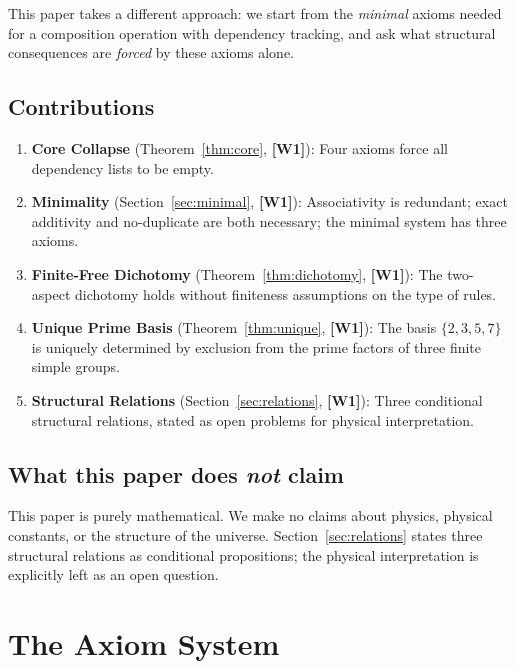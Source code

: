 ﻿\documentclass[11pt]{article}
\newcommand{\wone}[1]{\textcolor{wcolor}{\textbf{[#1]}}}
\begin{document}
This paper takes a different approach: we start from the
\emph{minimal} axioms needed for a composition operation
with dependency tracking, and ask what structural
consequences are \emph{forced} by these axioms alone.

\subsection{Contributions}
\begin{enumerate}
\item \textbf{Core Collapse} (Theorem~\ref{thm:core}, \wone{W1}):
  Four axioms force all dependency lists to be empty.
\item \textbf{Minimality} (Section~\ref{sec:minimal}, \wone{W1}):
  Associativity is redundant; exact additivity and
  no-duplicate are both necessary; the minimal system has
  three axioms.
\item \textbf{Finite-Free Dichotomy} (Theorem~\ref{thm:dichotomy}, \wone{W1}):
  The two-aspect dichotomy holds without finiteness
  assumptions on the type of rules.
\item \textbf{Unique Prime Basis} (Theorem~\ref{thm:unique}, \wone{W1}):
  The basis $\{2,3,5,7\}$ is uniquely determined by
  exclusion from the prime factors of three finite simple
  groups.
\item \textbf{Structural Relations} (Section~\ref{sec:relations}, \wone{W1}):
  Three conditional structural relations, stated as
  open problems for physical interpretation.
\end{enumerate}

\subsection{What this paper does \emph{not} claim}
This paper is purely mathematical. We make no claims about
physics, physical constants, or the structure of the
universe. Section~\ref{sec:relations} states three
structural relations as conditional propositions; the
physical interpretation is explicitly left as an open
question.

\section{The Axiom System}
\label{sec:axioms}
\end{document}
